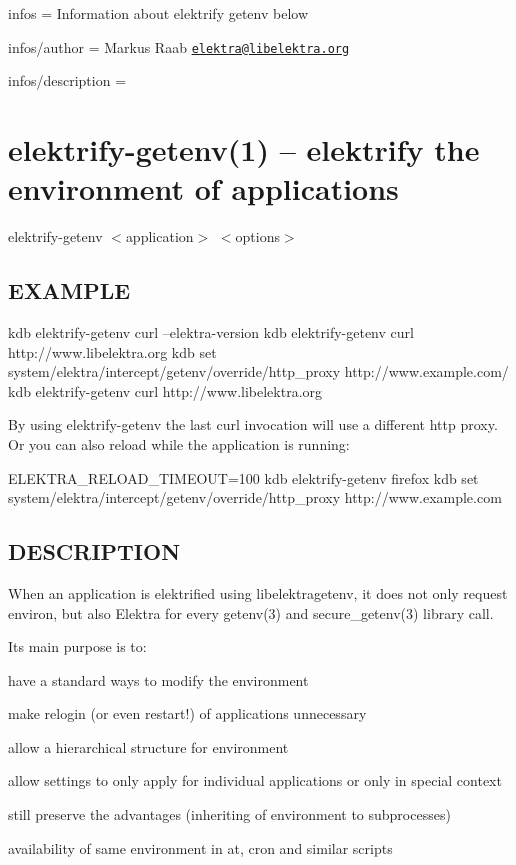 
\begin{DoxyItemize}
\item infos = Information about elektrify getenv below
\item infos/author = Markus Raab \href{mailto:elektra@libelektra.org}{\tt elektra@libelektra.\+org}
\item infos/description =
\end{DoxyItemize}

\section*{elektrify-\/getenv(1) -- elektrify the environment of applications }

{\ttfamily elektrify-\/getenv} $<$application$>$ $<$options$>$

\subsection*{E\+X\+A\+M\+P\+L\+E}

\begin{DoxyVerb}kdb elektrify-getenv curl --elektra-version
kdb elektrify-getenv curl http://www.libelektra.org
kdb set system/elektra/intercept/getenv/override/http_proxy http://www.example.com/
kdb elektrify-getenv curl http://www.libelektra.org
\end{DoxyVerb}


By using {\ttfamily elektrify-\/getenv} the last curl invocation will use a different http proxy. Or you can also reload while the application is running\+: \begin{DoxyVerb}ELEKTRA_RELOAD_TIMEOUT=100 kdb elektrify-getenv firefox
kdb set system/elektra/intercept/getenv/override/http_proxy http://www.example.com
\end{DoxyVerb}


\subsection*{D\+E\+S\+C\+R\+I\+P\+T\+I\+O\+N}

When an application is elektrified using libelektragetenv, it does not only request {\ttfamily environ}, but also Elektra for every getenv(3) and secure\+\_\+getenv(3) library call.

Its main purpose is to\+:


\begin{DoxyItemize}
\item have a standard ways to modify the environment
\item make relogin (or even restart!) of applications unnecessary
\item allow a hierarchical structure for environment
\item allow settings to only apply for individual applications or only in special context
\item still preserve the advantages (inheriting of environment to subprocesses)
\item availability of same environment in at, cron and similar scripts
\end{DoxyItemize}

